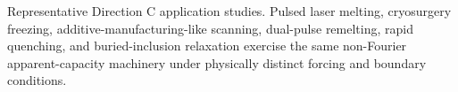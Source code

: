 \caption{Representative Direction C application studies. Pulsed laser melting, cryosurgery freezing, additive-manufacturing-like scanning, dual-pulse remelting, rapid quenching, and buried-inclusion relaxation exercise the same non-Fourier apparent-capacity machinery under physically distinct forcing and boundary conditions.}
\label{fig:direction-c-application-gallery}
